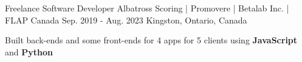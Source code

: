 \begin{cventries}
  \cventry
    {Freelance Software Developer} %
    {Albatross Scoring | Promovere | Betalab Inc. | FLAP Canada} %
    {Sep. 2019 - Aug. 2023} %
    {Kingston, Ontario, Canada} %
    {
      \begin{cvitems} %
        \item{Built back-ends and some front-ends for 4 apps for 5 clients using \textbf{JavaScript} and \textbf{Python}}

\end{cvitems}}
\end{cventries}
